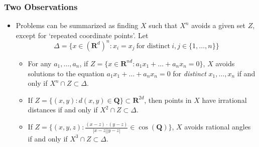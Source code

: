 \documentclass[usenames,dvipsnames]{beamer}
\begin{document}
\begin{frame}
    \frametitle{Two Observations}

    \begin{itemize}
        \item Problems can be summarized as finding $X$ such that $X^n$ avoids a given set $Z$, except for `repeated coordinate points'. Let
        \[ \Delta = \{ x \in (\mathbf{R}^d)^n: x_i = x_j\ \text{for distinct}\ i,j \in \{ 1, \dots, n \} \} \]
        \vspace{-1.5em}


        \begin{itemize}
            \pause
           \item For any $a_1, \dots, a_n$, if $Z = \{ x \in \mathbf{R}^{nd}: a_1x_1 + \dots + a_nx_n = 0 \}$, $X$ avoids solutions to the equation $a_1x_1 + \dots + a_nx_n = 0$ for {\it distinct} $x_1, \dots, x_n$ if and only if $X^n \cap Z \subset \Delta$.

           \pause
            \item If $Z = \{ (x,y): d(x,y) \in \mathbf{Q} \} \subset \mathbf{R}^{2d}$, then points in $X$ have irrational distances if and only if $X^2 \cap Z \subset \Delta$.

            \pause
            \item If $Z = \{ (x,y,z): \frac{(x-z) \cdot (y-z)}{|x-z||y-z|} \in \cos(\mathbf{Q}) \}$, $X$ avoids rational angles if and only if $X^3 \cap Z \subset \Delta$.
        \end{itemize}
    \end{itemize}
\end{frame}
\end{document}
